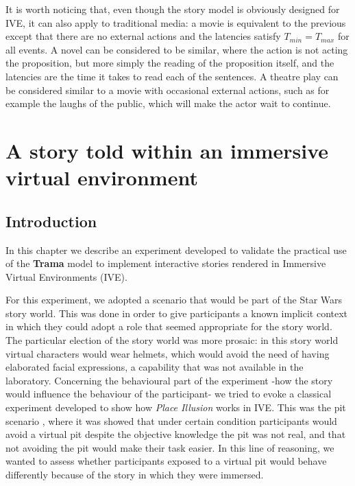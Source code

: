 \documentclass[
		twoside,openright,titlepage,numbers=noenddot,manychapters,
		headinclude,%
                footinclude=false,cleardoublepage=empty,
                BCOR=5mm,
		fontsize=11pt, %
                 enabledeprecatedfontcommands]{scrreprt}
\begin{document}
It is worth noticing that, even though the story model is obviously designed for IVE, it can also apply to traditional media: a movie is equivalent to the previous except that there are no external actions and the latencies satisfy $T_{min}=T_{max}$ for all events. A novel can be considered to be similar, where the action is not acting the proposition, but more simply the reading of the proposition itself, and the latencies are the time it takes to read each of the sentences. A theatre play can be considered similar to a movie with occasional external actions, such as for example the laughs of the public, which will make the actor wait to continue. %

\cleardoublepage





\chapter{A story told within an immersive virtual environment}
\thispagestyle{empty}
\label{ch_story}


\section{Introduction}
In this chapter we describe an experiment developed to validate the practical use of the \textbf{Trama} model to implement interactive stories rendered in Immersive Virtual Environments (IVE).

For this experiment, we adopted a scenario that would be part of the Star Wars story world. This was done in order to give participants a known implicit context in which they could adopt a role that seemed appropriate for the story world. The particular election of the story world was more prosaic: in this story world virtual characters would wear helmets, which would avoid the need of having elaborated facial expressions, a capability that was not available in the laboratory. Concerning the behavioural part of the experiment -how the story would influence the behaviour of the participant- we tried to evoke a classical experiment developed to show how \emph{Place Illusion} works in IVE. This was the pit scenario \cite[]{walk_place}, where it was showed that under certain condition participants would avoid a virtual pit despite the objective knowledge the pit was not real, and that not avoiding the pit would make their task easier. In this line of reasoning, we wanted to assess whether participants exposed to a virtual pit would behave differently because of the story in which they were immersed.
\end{document}
